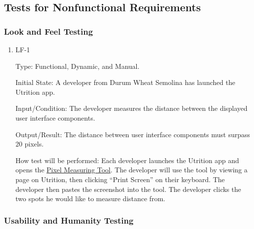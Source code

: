\documentclass[12pt, titlepage]{article}
\begin{document}
	\subsection{Tests for Nonfunctional Requirements}
	
	
	

	
	\subsubsection{Look and Feel Testing}
	
	
	\begin{enumerate}
		\item{LF-1} 
		
		Type: Functional, Dynamic, and Manual.
		
		Initial State: A developer from Durum Wheat Semolina has launched the Utrition app.
		
		Input/Condition: The developer measures the distance between the displayed user interface components.
		
		Output/Result: The distance between user interface components must surpass 20 pixels.
		
		How test will be performed: Each developer launches the Utrition app and opens the \href{https://www.rapidtables.com/web/tools/pixel-ruler.html}{Pixel Measuring Tool}. The developer will use the tool by viewing a page on Utrition, then clicking “Print Screen'' on their keyboard. The developer then pastes the screenshot into the tool. The developer clicks the two spots he would like to measure distance from.
		
	\end{enumerate}
	
	\subsubsection{Usability and Humanity Testing}
	
\end{document}
